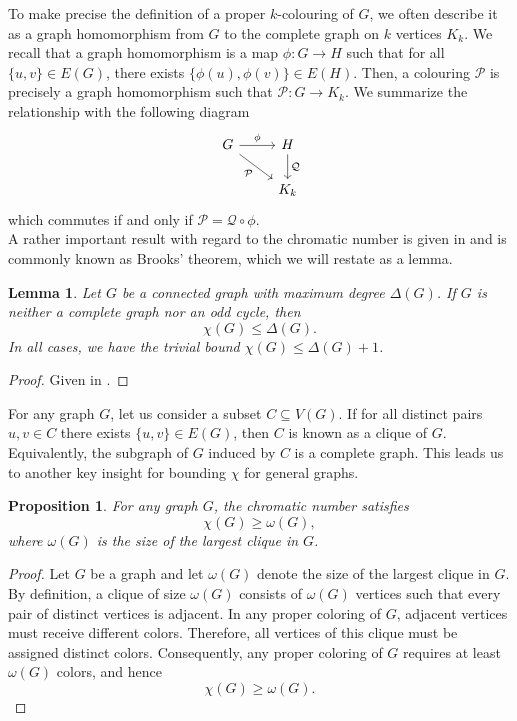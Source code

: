 \documentclass[12pt]{amsart}
\numberwithin{figure}{section}
\theoremstyle{plain}
\newtheorem{proposition}[theorem]{Proposition}
\newtheorem{lemma}[theorem]{Lemma}
\begin{document}
\indent To make precise the definition of a proper $k$-colouring of $G$, we often describe it as a graph homomorphism from $G$ to the complete graph on $k$ vertices $K_{k}$. We recall that a graph homomorphism is a map $\phi:G\to H$ such that for all $\{u,v\}\in E(G)$, there exists $\{\phi(u), \phi(v)\}\in E(H)$. Then, a colouring $\mathcal{P}$ is precisely a graph homomorphism such that $\mathcal{P}:G\to K_{k}$. We summarize the relationship with the following diagram
\[\begin{tikzcd}
G \arrow[r,"\phi"] \arrow[dr, "\mathcal{P}"'] & H \arrow[d, "\mathcal{Q}"] \\ & K_k \end{tikzcd}\]
which commutes if and only if $\mathcal{P} = \mathcal{Q}\circ\phi$.\\
\indent A rather important result with regard to the chromatic number is given in \cite{Brooks41} and is commonly known as Brooks' theorem, which we will restate as a lemma.
\begin{lemma}
    Let $G$ be a connected graph with maximum degree $\Delta(G)$. If $G$ is neither a complete graph nor an odd cycle, then
    \[\chi(G) \leq \Delta(G).\]
    In all cases, we have the trivial bound $\chi(G) \leq \Delta(G) + 1$.
\end{lemma}
\begin{proof}
    Given in \cite{Brooks41}.
\end{proof}
\indent For any graph $G$, let us consider a subset $C\subseteq V(G)$. If for all distinct pairs $u, v \in C$ there exists $\{u,v\}\in E(G)$, then $C$ is known as a clique of $G$. Equivalently, the subgraph of $G$ induced by $C$ is a complete graph. This leads us to another key insight for bounding $\chi$ for general graphs.
\begin{proposition}
    For any graph $G$, the chromatic number satisfies
    \[\chi(G) \geq \omega(G),\]
    where $\omega(G)$ is the size of the largest clique in $G$.
\end{proposition}
\begin{proof}
    Let $G$ be a graph and let $\omega(G)$ denote the size of the largest clique in $G$. By definition, a clique of size $\omega(G)$ consists of $\omega(G)$ vertices such that every pair of distinct vertices is adjacent. In any proper coloring of $G$, adjacent vertices must receive different colors. Therefore, all vertices of this clique must be assigned distinct colors. Consequently, any proper coloring of $G$ requires at least $\omega(G)$ colors, and hence
    \[\chi(G) \geq \omega(G).\]
\end{proof}
\end{document}
